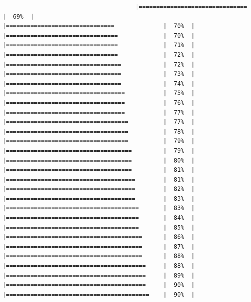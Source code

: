 \documentclass[
  krantz2]{krantz}
\begin{document}
\begin{verbatim}
                                      |===============================              |  69%  |                                                     |===============================              |  70%  |                                                     |================================             |  70%  |                                                     |================================             |  71%  |                                                     |================================             |  72%  |                                                     |=================================            |  72%  |                                                     |=================================            |  73%  |                                                     |=================================            |  74%  |                                                     |==================================           |  75%  |                                                     |==================================           |  76%  |                                                     |==================================           |  77%  |                                                     |===================================          |  77%  |                                                     |===================================          |  78%  |                                                     |===================================          |  79%  |                                                     |====================================         |  79%  |                                                     |====================================         |  80%  |                                                     |====================================         |  81%  |                                                     |=====================================        |  81%  |                                                     |=====================================        |  82%  |                                                     |=====================================        |  83%  |                                                     |======================================       |  83%  |                                                     |======================================       |  84%  |                                                     |======================================       |  85%  |                                                     |=======================================      |  86%  |                                                     |=======================================      |  87%  |                                                     |=======================================      |  88%  |                                                     |========================================     |  88%  |                                                     |========================================     |  89%  |                                                     |========================================     |  90%  |                                                     |=========================================    |  90%  |                                                     
\end{verbatim}
\end{document}
